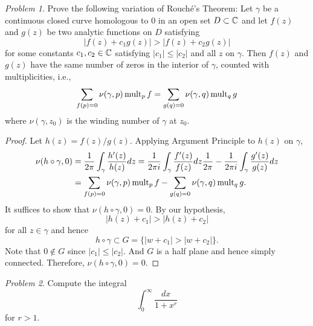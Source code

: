 \documentclass[11pt]{amsart}
\theoremstyle{remark}
\newtheorem{prob}{Problem}[section]
\theoremstyle{definition}
\numberwithin{equation}{section}
\begin{document}
\begin{prob}
    Prove the following variation of Rouch\'e's Theorem:
    Let $\gamma$ be a continuous closed curve homologous to $0$ in an open set $D\subset {\mathbb C}$ and let $f(z)$ and $g(z)$ be two analytic functions on $D$ satisfying
    \[
        |f(z) + c_1 g(z)| > |f(z) + c_2g(z)|
    \]
    for some constants $c_1, c_2\in {\mathbb C}$ satisfying $|c_1| \le |c_2|$ and all $z$ on $\gamma$. Then $f(z)$ and $g(z)$ have the same number of zeros in the interior of $\gamma$, counted with multiplicities, i.e.,
    \[
        \sum_{f(p) = 0} \nu(\gamma, p) \mathop{\mathrm{mult}}\nolimits_p f
        = \sum_{g(q) = 0} \nu(\gamma, q) \mathop{\mathrm{mult}}\nolimits_q g
    \]
    where $\nu(\gamma,z_0)$ is the winding number of $\gamma$ at $z_0$.
\end{prob}

\begin{proof}
    Let $h(z) = f(z)/g(z)$. Applying Argument Principle to $h(z)$ on $\gamma$,
    \[
        \begin{aligned}
            \nu(h\circ \gamma, 0) & = \frac{1}{2\pi} \int_{\gamma}\frac{h'(z)}{h(z)} dz
            = \frac{1}{2\pi i} \int_{\gamma} \frac{f'(z)}{f(z)} dz \frac{1}{2\pi} - \frac{1}{2\pi i}\int_{\gamma}\frac{g'(z)}{g(z)} dz
            \\
                                  & = \sum_{f(p) = 0} \nu(\gamma, p) \mathop{\mathrm{mult}}\nolimits_p f
            - \sum_{g(q) = 0} \nu(\gamma, q) \mathop{\mathrm{mult}}\nolimits_q g.
        \end{aligned}
    \]
    It suffices to show that $\nu(h\circ \gamma, 0) = 0$. By our hypothesis,
    \[
        |h(z) + c_1| > |h(z) + c_2|
    \]
    for all $z\in \gamma$ and hence
    \[
        h\circ \gamma \subset G = \big\{|w+c_1| > |w + c_2|\big\}.
    \]
    Note that $0\not\in G$ since $|c_1| \le |c_2|$. And $G$ is a half plane and hence simply connected. Therefore, $\nu(h\circ \gamma, 0) = 0$.
\end{proof}

\begin{prob}
    Compute the integral
    \[
        \int_0^\infty \frac{dx}{1 + x^r}
    \]
    for $r > 1$.
\end{prob}
\end{document}
